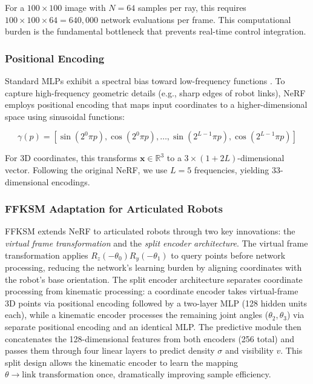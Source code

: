 \documentclass[12pt,a4paper,oneside]{report}
\begin{document}
For a $100 \times 100$ image with $N = 64$ samples per ray, this requires $100 \times 100 \times 64 = 640,000$ network evaluations per frame. This computational burden is the fundamental bottleneck that prevents real-time control integration.

\subsubsection{Positional Encoding}
\label{subsubsec:positional_encoding}

Standard MLPs exhibit a spectral bias toward low-frequency functions \cite{rahaman2019spectral}. To capture high-frequency geometric details (e.g., sharp edges of robot links), NeRF employs positional encoding that maps input coordinates to a higher-dimensional space using sinusoidal functions:

\begin{equation}
\gamma(p) = [\sin(2^0 \pi p), \cos(2^0 \pi p), \ldots, \sin(2^{L-1} \pi p), \cos(2^{L-1} \pi p)]
\end{equation}

For 3D coordinates, this transforms $\mathbf{x} \in \mathbb{R}^3$ to a $3 \times (1 + 2L)$-dimensional vector. Following the original NeRF, we use $L = 5$ frequencies, yielding 33-dimensional encodings.

\subsubsection{FFKSM Adaptation for Articulated Robots}
\label{subsubsec:ffksm_adaptation_for_articulated_robots}

FFKSM extends NeRF to articulated robots through two key innovations: the \textit{virtual frame transformation} and the \textit{split encoder architecture}. The virtual frame transformation applies $R_z(-\theta_0) R_y(-\theta_1)$ to query points before network processing, reducing the network's learning burden by aligning coordinates with the robot's base orientation. The split encoder architecture separates coordinate processing from kinematic processing: a coordinate encoder takes virtual-frame 3D points via positional encoding followed by a two-layer MLP (128 hidden units each), while a kinematic encoder processes the remaining joint angles ($\theta_2, \theta_3$) via separate positional encoding and an identical MLP. The predictive module then concatenates the 128-dimensional features from both encoders (256 total) and passes them through four linear layers to predict density $\sigma$ and visibility $v$. This split design allows the kinematic encoder to learn the mapping $\theta \rightarrow \text{link transformation}$ once, dramatically improving sample efficiency.
\end{document}
